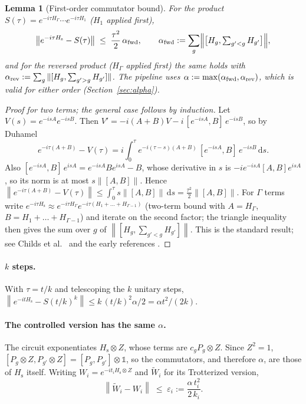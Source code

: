 \documentclass[11pt]{article}
\newtheorem{lemma}{Lemma}
\theoremstyle{definition}
\newcommand{\norm}[1]{\left\lVert #1\right\rVert}
\newcommand{\Hs}{H_{\mathrm s}}
\newcommand{\eps}{\varepsilon}
\begin{document}
\begin{lemma}[First-order commutator bound]\label{lem:comm}
For the product $S(\tau)=e^{-i\tau H_\Gamma}\cdots e^{-i\tau H_1}$ ($H_1$ applied first),
\[
  \norm{e^{-i\tau\Hs}-S(\tau)}\;\le\;\frac{\tau^2}{2}\,\alpha_{\rm fwd},\qquad
  \alpha_{\rm fwd}:=\sum_{g}\Bigl\lVert\bigl[H_g,\textstyle\sum_{g'<g}H_{g'}\bigr]\Bigr\rVert ,
\]
and for the reversed product ($H_\Gamma$ applied first) the same holds with $\alpha_{\rm rev}:=\sum_g\|[H_g,\sum_{g'>g}H_{g'}]\|$. The pipeline uses
$\alpha:=\max(\alpha_{\rm fwd},\alpha_{\rm rev})$, which is valid for either order (Section~\ref{sec:alpha}).
\end{lemma}
\begin{proof}[Proof for two terms; the general case follows by induction]
Let $V(s)=e^{-isA}e^{-isB}$. Then $V'=-i(A+B)V-i\,[e^{-isA},B]\,e^{-isB}$, so by Duhamel
\[
  e^{-i\tau(A+B)}-V(\tau)=i\int_0^\tau e^{-i(\tau-s)(A+B)}\,[e^{-isA},B]\,e^{-isB}\,\mathrm ds .
\]
Also $[e^{-isA},B]\,e^{isA}=e^{-isA}Be^{isA}-B$, whose derivative in $s$ is $-ie^{-isA}[A,B]e^{isA}$, so its norm is at
most $s\norm{[A,B]}$. Hence $\norm{e^{-i\tau(A+B)}-V(\tau)}\le\int_0^\tau s\norm{[A,B]}\,\mathrm ds=\tfrac{\tau^2}2\norm{[A,B]}$.
For $\Gamma$ terms write $e^{-i\tau\Hs}\approx e^{-i\tau H_\Gamma}e^{-i\tau(H_1+\dots+H_{\Gamma-1})}$ (two-term bound with $A=H_\Gamma$, $B=H_1+\dots+H_{\Gamma-1}$) and iterate on
the second factor; the triangle inequality then gives the sum over $g$ of $\norm{[H_g,\sum_{g'<g}H_{g'}]}$. This is the standard result; see Childs et al.~\cite{childs} and the early references
\cite{lloyd,trotter}.
\end{proof}

\paragraph{$k$ steps.} With $\tau=t/k$ and telescoping the $k$ unitary steps,
$\norm{e^{-it\Hs}-S(t/k)^k}\le k\,(t/k)^2\alpha/2=\alpha t^2/(2k)$.

\paragraph{The controlled version has the same $\alpha$.} The circuit exponentiates $\Hs\otimes Z$, whose terms are
$c_gP_g\otimes Z$. Since $Z^2=1$, $[P_g\otimes Z,P_{g'}\otimes Z]=[P_g,P_{g'}]\otimes\mathbb 1$, so the commutators, and
therefore $\alpha$, are those of $\Hs$ itself. Writing $W_i=e^{-it_i\Hs\otimes Z}$ and $\tilde W_i$ for its Trotterized version,
\begin{equation}\label{eq:epsi}
  \norm{\tilde W_i-W_i}\;\le\;\eps_i:=\frac{\alpha\,t_i^2}{2\,k_i}.
\end{equation}
\end{document}

